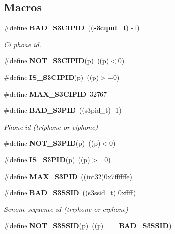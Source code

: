 \subsection*{Macros}
\begin{DoxyCompactItemize}
\item 
\#define {\bf B\+A\+D\+\_\+\+S3\+C\+I\+P\+I\+D}~(({\bf s3cipid\+\_\+t}) -\/1)\label{s3types_8h_af9c51863cdbb10d58b6aad21e896666b}

\begin{DoxyCompactList}\small\item\em Ci phone id. \end{DoxyCompactList}\item 
\#define {\bfseries N\+O\+T\+\_\+\+S3\+C\+I\+P\+I\+D}(p)~((p)$<$0)\label{s3types_8h_ad7a2359e1e705906c58fe33f9729f6ce}

\item 
\#define {\bfseries I\+S\+\_\+\+S3\+C\+I\+P\+I\+D}(p)~((p)$>$=0)\label{s3types_8h_af719889a0db4f4f0b4b2ac9201bbe7cd}

\item 
\#define {\bfseries M\+A\+X\+\_\+\+S3\+C\+I\+P\+I\+D}~32767\label{s3types_8h_a453101a056aef746b77e9768a1cb60a5}

\item 
\#define {\bf B\+A\+D\+\_\+\+S3\+P\+I\+D}~((s3pid\+\_\+t) -\/1)\label{s3types_8h_a4037acb07f1abc6c8a1aac0841556440}

\begin{DoxyCompactList}\small\item\em Phone id (triphone or ciphone) \end{DoxyCompactList}\item 
\#define {\bfseries N\+O\+T\+\_\+\+S3\+P\+I\+D}(p)~((p)$<$0)\label{s3types_8h_ae3dad97c1cf3e6347c347bf633ee27dd}

\item 
\#define {\bfseries I\+S\+\_\+\+S3\+P\+I\+D}(p)~((p)$>$=0)\label{s3types_8h_afe39bcb2b878fb92ebd7b3e249304264}

\item 
\#define {\bfseries M\+A\+X\+\_\+\+S3\+P\+I\+D}~((int32)0x7ffffffe)\label{s3types_8h_a1141ddc85d582a6e1a1c70609baab281}

\item 
\#define {\bf B\+A\+D\+\_\+\+S3\+S\+S\+I\+D}~((s3ssid\+\_\+t) 0xffff)\label{s3types_8h_ade0bee313d69b3d324b5622fa0507ec7}

\begin{DoxyCompactList}\small\item\em Senone sequence id (triphone or ciphone) \end{DoxyCompactList}\item 
\#define {\bfseries N\+O\+T\+\_\+\+S3\+S\+S\+I\+D}(p)~((p) == {\bf B\+A\+D\+\_\+\+S3\+S\+S\+I\+D})\label{s3types_8h_a970be643bdeb0467b4bab2395d76293b}


\end{DoxyCompactItemize}
